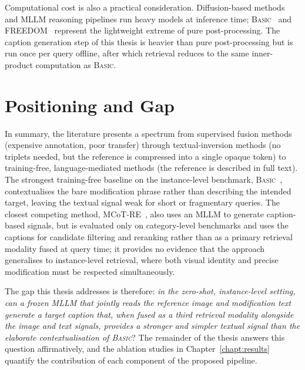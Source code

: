 Computational cost is also a practical consideration. Diffusion-based
methods~\cite{gu2024compodiff} and MLLM reasoning pipelines run heavy models at
inference time; \textsc{Basic}~\cite{psomas2025icir} and
FREEDOM~\cite{efthymiadis2025freedom} represent the lightweight extreme of pure
post-processing. The caption generation step of this thesis is heavier than
pure post-processing but is run once per query offline, after which retrieval
reduces to the same inner-product computation as \textsc{Basic}.

\section{Positioning and Gap}\label{sect:rel_gap}

In summary, the literature presents a spectrum from supervised fusion methods
(expensive annotation, poor transfer) through textual-inversion methods (no
triplets needed, but the reference is compressed into a single opaque token)
to training-free, language-mediated methods (the reference is described in full
text). The strongest training-free baseline on the instance-level benchmark,
\textsc{Basic}~\cite{psomas2025icir}, contextualises the bare modification phrase
rather than describing the intended target, leaving the textual signal weak for
short or fragmentary queries. The closest competing method,
MCoT-RE~\cite{park2025mcot}, also uses an MLLM to generate caption-based signals,
but is evaluated only on category-level benchmarks and uses the captions for
candidate filtering and reranking rather than as a primary retrieval modality
fused at query time; it provides no evidence that the approach generalises to
instance-level retrieval, where both visual identity and precise modification
must be respected simultaneously.

The gap this thesis addresses is therefore: \emph{in the zero-shot, instance-level
setting, can a frozen MLLM that jointly reads the reference image and modification
text generate a target caption that, when fused as a third retrieval modality
alongside the image and text signals, provides a stronger and simpler textual
signal than the elaborate contextualisation of \textsc{Basic}}? The remainder of
the thesis answers this question affirmatively, and the ablation studies in
Chapter~\ref{chapt:results} quantify the contribution of each component of the
proposed pipeline.

